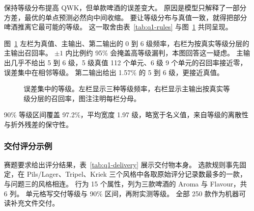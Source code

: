 保持等级分布提高 QWK，但单款啤酒的误差变大。
原因是模型只解释了一部分方差，最优的单点预测必然向中间收缩。
要让等级分布与真值一致，就得把部分啤酒推离它最可能的等级。
这一取舍由表~\ref{tab:q1-rules} 与图~\ref{fig:q1-grade} 共同呈现。

图~\ref{fig:q1-grade} 左栏为真值、主输出、第二输出的 0 到 6 级频率，右栏为按真实等级分层的主输出召回率。
$\pm1$ 内比例约 95\% 会掩盖高等级漏判，本图回答这一疑虑。
主输出几乎不给出 5 到 6 级，5 级真值 112 个单元、6 级 9 个单元的召回率接近零，误差集中在相邻等级。
第二输出给出 1.57\% 的 5 到 6 级，更接近真值。

\begin{figure}[htbp]\centering
{}
\caption{误差集中的等级。左栏显示三种等级频率，右栏显示主输出按真实等级分层的召回率，图注注明每栏分母。}
\label{fig:q1-grade}
\end{figure}

90\% 等级区间覆盖 97.2\%，平均宽度 1.97 级，略宽于名义值，来自等级的离散性与折外残差的保守性。

\subsubsection{交付评分示例}

赛题要求给出评分结果，表~\ref{tab:q1-delivery} 展示交付物本身。
选款规则事先固定，在 Pils/Lager、Tripel、Kriek 三个风格中各取原始评分记录数最多的一款，与问题三的风格相连。
行为 15 个属性，列为三款啤酒的 Aroma 与 Flavour，共 6 列。
单元格写交付等级与 90\% 区间，再附实测等级。
全部 250 款作为机器可读补充文件交付。

\begin{table}[htbp]
\centering\small
\caption{交付评分示例：三款啤酒的 15 个属性}
\label{tab:q1-delivery}
\end{table}

